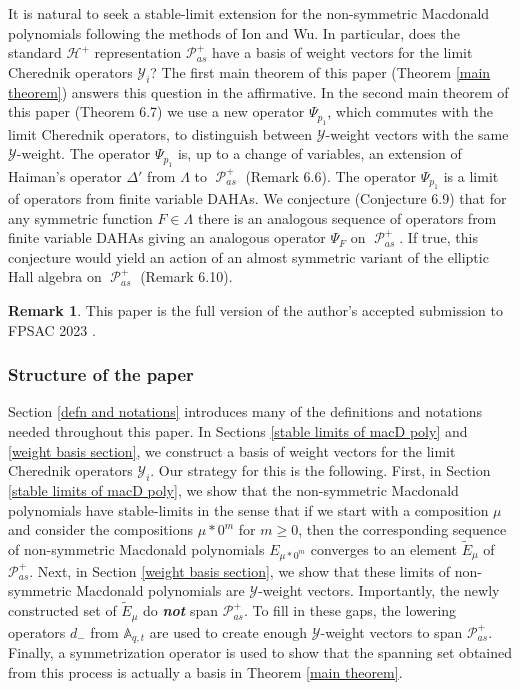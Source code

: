 \documentclass[11pt]{article}
\theoremstyle{definition}
\newtheorem{rema}[theo]{Remark}
\numberwithin{equation}{section}
\newcommand{\y}{{ \mathscr{Y} }}
\DeclareMathOperator{\sP}{\mathscr{P} }
\begin{document}
It is natural to seek a stable-limit extension for the non-symmetric Macdonald polynomials following the methods of Ion and Wu. In particular, does the standard $\mathscr{H}^{+}$ representation $\mathscr{P}_{as}^{+}$ have a basis of weight vectors for the limit Cherednik operators $\y_i$? The first main theorem of this paper (Theorem \ref{main theorem}) answers this question in the affirmative. In the second main theorem of this paper (Theorem 6.7) we use a new operator $\Psi_{p_1}$, which commutes with the limit Cherednik operators, to distinguish between $\y$-weight vectors with the same $\y$-weight. The operator $\Psi_{p_1}$ is, up to a change of variables, an extension of Haiman's operator $\Delta'$ \cite{HMacDG} from $\Lambda$ to $\sP_{as}^{+}$ (Remark 6.6). The operator $\Psi_{p_1}$ is a limit of operators from finite variable DAHAs. We conjecture (Conjecture 6.9) that for any symmetric function $F \in \Lambda$ there is an analogous sequence of operators from finite variable DAHAs giving an analogous operator $\Psi_{F}$ on $\sP_{as}^{+}.$ If true, this conjecture would yield an action of an almost symmetric variant of the elliptic Hall algebra \cite{BS, SV} on $\sP_{as}^{+}$ (Remark 6.10).

\begin{rema}
This paper is the full version of the author's accepted submission to FPSAC 2023 \cite{MBW}.
\end{rema}

\subsubsection*{Structure of the paper}
Section \ref{defn and notations} introduces many of the definitions and notations needed throughout this paper. In Sections \ref{stable limits of macD poly} and \ref{weight basis section},
we construct a basis of weight vectors for the limit Cherednik operators $\mathscr{Y}_i$.
Our strategy for this is the following. First, in Section \ref{stable limits of macD poly}, we show that the non-symmetric Macdonald polynomials have stable-limits in the sense that if we start with a composition $\mu$ and consider the compositions $\mu * 0^m$ for $m \geq 0$, then the corresponding sequence of non-symmetric Macdonald polynomials $E_{\mu * 0^m}$ converges to an element $\widetilde{E}_{\mu}$ of $\mathscr{P}_{as}^{+}$. Next, in Section \ref{weight basis section}, we show that these limits of non-symmetric Macdonald polynomials are $\mathscr{Y}$-weight vectors. Importantly, the newly constructed set of $\widetilde{E}_{\mu}$ do \textbf{\textit{not}} span $\mathscr{P}_{as}^{+}$. To fill in these gaps, the lowering operators $d_{-}$ from $\mathbb{A}_{q,t}$ are used to create enough $\y$-weight vectors to span $\mathscr{P}_{as}^{+}$. Finally, a symmetrization operator is used to show that the spanning set obtained from this process is actually a basis in Theorem \ref{main theorem}.
\end{document}
